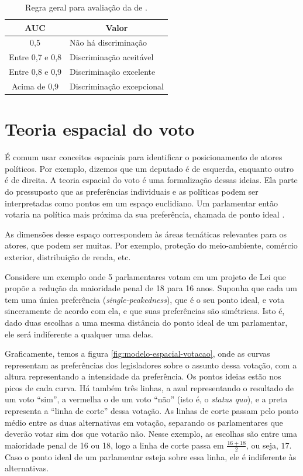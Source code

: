\documentclass[a4paper,titlepage]{ppgi}\usepackage[]{graphicx}\usepackage[]{color}
\begin{document}
\begin{table}
\centering
\begin{tabular}{c l}
  \acrshort{AUC} & \multicolumn{1}{c}{Valor} \\
  \hline
  0,5 & Não há discriminação \\
  Entre 0,7 e 0,8 & Discriminação aceitável \\
  Entre 0,8 e 0,9 & Discriminação excelente \\
  Acima de 0,9 & Discriminação excepcional \\
\end{tabular}
\caption{Regra geral para avaliação da  de .}
\label{table:valores-auc}
\end{table}

\section{Teoria espacial do voto}
\label{cap:fundamentacao:teoria-espacial-do-voto}



É comum usar conceitos espaciais para identificar o posicionamento de
atores políticos. Por exemplo, dizemos que um deputado é de esquerda, enquanto
outro é de direita. A teoria espacial do voto é uma formalização dessas ideias.
Ela parte do pressuposto que as preferências individuais e as políticas podem
ser interpretadas como pontos em um espaço euclidiano. Um parlamentar então
votaria na política mais próxima da sua preferência, chamada de ponto ideal
\cite{Leoni2002}.

As dimensões desse espaço correspondem às áreas temáticas relevantes para os
atores, que podem ser muitas. Por exemplo, proteção do meio-ambiente, comércio
exterior, distribuição de renda, etc.

Considere um exemplo onde 5 parlamentares votam em um
projeto de Lei que propõe a redução da maioridade penal de
18 para 16 anos. Suponha
que cada um tem uma única preferência (\emph{single-peakedness}), que é o seu
ponto ideal, e vota sinceramente de acordo com ela, e que suas preferências são
simétricas. Isto é, dado duas escolhas a uma mesma distância do ponto ideal de
um parlamentar, ele será indiferente a qualquer uma delas.

Graficamente, temos a figura \ref{fig:modelo-espacial-votacao}, onde as curvas
representam as preferências dos legisladores sobre o assunto dessa votação, com
a altura representando a intensidade da preferência. Os pontos ideias estão nos
picos de cada curva. Há também três linhas, a azul representando o resultado de
um voto ``sim'', a vermelha o de um voto ``não'' (isto é, o \emph{status quo}),
e a preta representa a ``linha de corte'' dessa votação. As linhas de corte
passam pelo ponto médio entre as duas alternativas em votação, separando os
parlamentares que deverão votar sim dos que votarão não. Nesse exemplo, as
escolhas são entre uma maioridade penal de 16 ou
18, logo a linha de corte passa em $\frac{16 +
18}{2}$, ou seja, $17$. Caso o ponto ideal de um parlamentar esteja sobre essa
linha, ele é indiferente às alternativas.
\end{document}
